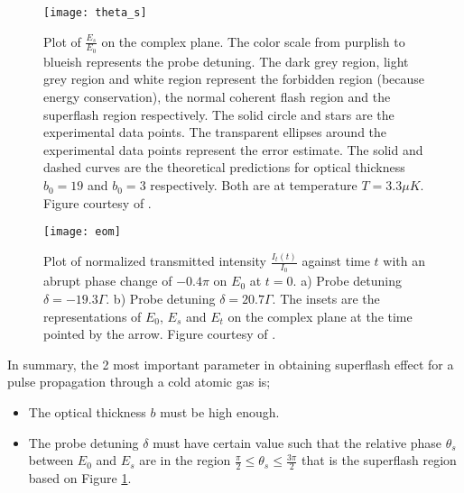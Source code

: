 \begin{figure}[h!]
    \centering
    \texttt{[image: theta\_s]}
    \caption{Plot of $\frac{E_{s}}{E_{0}}$ on the complex plane. The color scale from purplish to blueish represents the probe detuning. The dark grey region, light grey region and white region represent the forbidden region (because energy conservation), the normal coherent flash region and the superflash region respectively. The solid circle and stars are the experimental data points. The transparent ellipses around the experimental data points represent the error estimate. The solid and dashed curves are the theoretical predictions for optical thickness $b_{0} = 19$ and $b_{0} = 3$ respectively. Both are at temperature $T = 3.3\mu K$. Figure courtesy of \cite{Kwong2014}.}
    \label{fig: theta_s}
\end{figure}

\begin{figure}[h!]
    \centering
    \texttt{[image: eom]}
    \caption{Plot of normalized transmitted intensity $\frac{I_{t}(t)}{I_{0}}$ against time $t$ with an abrupt phase change of $-0.4\pi$ on $E_{0}$ at $t = 0$. a) Probe detuning $\delta = -19.3\Gamma$. b) Probe detuning $\delta = 20.7\Gamma$. The insets are the representations of $E_{0}$, $E_{s}$ and $E_{t}$ on the complex plane at the time pointed by the arrow. Figure courtesy of \cite{Kwong2014}.}
    \label{fig: eom}
\end{figure}

In summary, the 2 most important parameter in obtaining superflash effect for a pulse propagation through a cold atomic gas is;

\begin{itemize}
    \item The optical thickness $b$ must be high enough.
    \item The probe detuning $\delta$ must have certain value such that the relative phase $\theta_{s}$ between $E_{0}$ and $E_{s}$ are in the region $\frac{\pi}{2} \leq \theta_{s} \leq \frac{3\pi}{2}$ that is the superflash region based on Figure \ref{fig: theta_s}.
\end{itemize}


